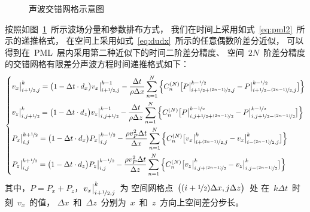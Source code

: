 \documentclass[UTF8]{ctexart}
\begin{document}
\begin{figure}[t]
  \centering
  
  \caption{声波交错网格示意图}\label{fig:asg}
\end{figure}

按照如图~\ref{fig:asg}~所示波场分量和参数排布方式，
我们在时间上采用如式~\eqref{eq:pml2}~所示的递推格式，
在空间上采用如式~\eqref{eq:dudx}~所示的任意偶数阶差分近似，
可以得到在~PML~层内采用第二种近似下的时间二阶差分精度、
空间~$2N$~阶差分精度的交错网格有限差分声波方程时间递推格式如下：
\begin{equation}
\left\{ \begin{aligned}
& v_x\big|_{i+\nicefrac{1}{2},j}^k=\big(1-\Delta t\cdot d_x\big) v_x\big|_{i+\nicefrac{1}{2},j}^{k-1}-\frac{\Delta t}{\rho\Delta x}\sum\limits_{n=1}^N\Big\{C_n^{(N)}\big[P\big|_{i+\nicefrac{1}{2}+\nicefrac{(2n-1)}{2},j}^{k-\nicefrac{1}{2}}-P\big|_{i+\nicefrac{1}{2}-\nicefrac{(2n-1)}{2},j}^{k-\nicefrac{1}{2}}\big]\Big\} \\
& v_z\big|_{i,j+\nicefrac{1}{2}}^k=\big(1-\Delta t\cdot d_z\big) v_z\big|_{i,j+\nicefrac{1}{2}}^{k-1}-\frac{\Delta t}{\rho\Delta z}\sum\limits_{n=1}^N\Big\{C_n^{(N)}\big[P\big|_{i,j+\nicefrac{1}{2}+\nicefrac{(2n-1)}{2}}^{k-\nicefrac{1}{2}}-P\big|_{i,j+\nicefrac{1}{2}-\nicefrac{(2n-1)}{2}}^{k-\nicefrac{1}{2}}\big]\Big\} \\
& P_x\big|_{i,j}^{k+\nicefrac{1}{2}}=\big(1-\Delta t\cdot d_x\big) P_x\big|_{i,j}^{k-\nicefrac{1}{2}}-\frac{\rho v_P^2\Delta t}{\Delta x}\sum\limits_{n=1}^N\Big\{C_n^{(N)}\big[v_x\big|_{i+\nicefrac{(2n-1)}{2},j}^k-v_x\big|_{i-\nicefrac{(2n-1)}{2},j}^k\big]\Big\} \\
& P_z\big|_{i,j}^{k+\nicefrac{1}{2}}=\big(1-\Delta t\cdot d_z\big) P_z\big|_{i,j}^{k-\nicefrac{1}{2}}-\frac{\rho v_P^2\Delta t}{\Delta z}\sum\limits_{n=1}^N\Big\{C_n^{(N)}\big[v_z\big|_{i,j+\nicefrac{(2n-1)}{2}}^k-v_z\big|_{i,j-\nicefrac{(2n-1)}{2}}^k\big]\Big\}
\end{aligned} \right.
\end{equation}
其中，$P=P_x+P_z$，$v_x\big|_{i+\nicefrac{1}{2},j}^k$~为
空间网格点~$\big((i+\nicefrac{1}{2})\Delta x,j\Delta z\big)$~处
在~$k\Delta t$~时刻~$v_x$~的值，
$\Delta x$~和~$\Delta z$~分别为~$x$~和~$z$~方向上空间差分步长。
\end{document}
